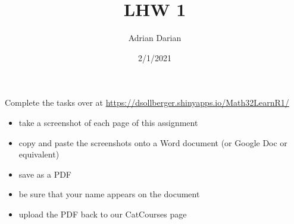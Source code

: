 \documentclass[a4paper]{article}
\title{LHW 1}
\author{Adrian Darian}
\date{2/1/2021}
\begin{document}
  
\maketitle

Complete the tasks over at \url{https://dsollberger.shinyapps.io/Math32LearnR1/}

\begin{itemize}
	\item take a screenshot of each page of this assignment
	\item copy and paste the screenshots onto a Word document (or Google Doc or equivalent)
	\item save as a PDF
	\item be sure that your name appears on the document
	\item upload the PDF back to our CatCourses page
\end{itemize}
\end{document}
